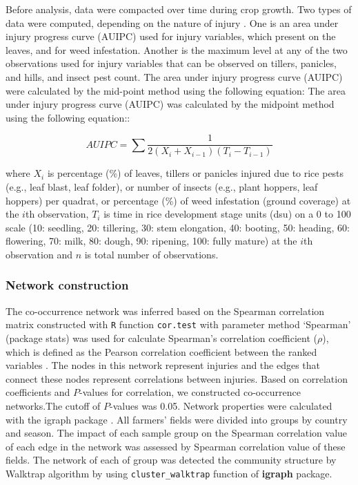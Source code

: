 Before analysis, data were compacted over time during crop growth. Two types of data were computed, depending on the nature of injury \citet{Savary_2009_Survey}. One is an area under injury progress curve (AUIPC) used for injury variables, which present on the leaves, and for weed infestation. Another is the maximum level at any of the two observations used for injury variables that can be observed on tillers, panicles, and hills, and insect pest count. The area under injury progress curve (AUIPC) \citep{Campbell_1990_Introduction} were calculated by the mid-point method using the following equation: The area under injury progress curve (AUIPC) was calculated by the midpoint method using the following equation::

\begin{equation}
AUIPC = \sum{\frac{1}{2(X_{i} + X_{i-1})(T_{i} - T_{i-1})}}
\end{equation}

where $X_i$ is percentage (\%) of leaves, tillers or panicles injured due to rice pests (e.g., leaf blast, leaf folder), or number of insects (e.g., plant hoppers, leaf hoppers) per quadrat, or percentage (\%) of weed infestation (ground coverage) at the $i$th observation, $T_i$ is time in rice development stage units (dsu) on a 0 to 100 scale (10: seedling, 20: tillering, 30: stem elongation, 40: booting, 50: heading, 60: flowering, 70: milk, 80: dough, 90: ripening, 100: fully mature) at the $i$th observation and $n$ is total number of observations.

\subsubsection{Network construction}

The co-occurrence network was inferred based on the Spearman correlation matrix constructed with \texttt{R} function \texttt{cor.test} with parameter method `Spearman' (package stats) was used for calculate Spearman's correlation coefficient ($\rho$), which is defined as the Pearson correlation coefficient between the ranked variables \cite{R_2015}. The nodes in this network represent injuries and the edges that connect these nodes represent correlations between injuries. Based on correlation coefficients and $P$-values for correlation, we constructed co-occurrence networks.The cutoff of $P$-values was 0.05. Network properties were calculated with the igraph package \citep{Csardi_2010_igraph}. All farmers' fields were divided into groups by country and season. The impact of each sample group on the Spearman correlation value of each edge in the network was assessed by Spearman correlation value of these fields. The network of each of group was detected the community structure by Walktrap algorithm by using \texttt{cluster_walktrap} function of \textbf{igraph} package.


